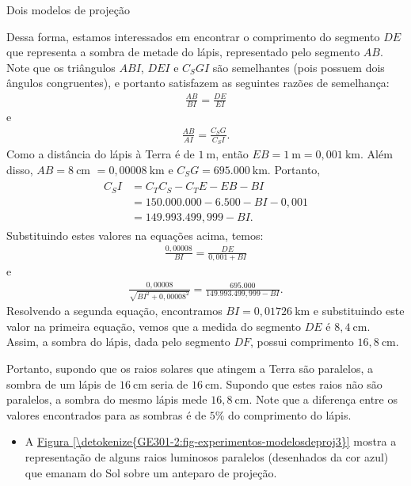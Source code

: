 \begin{answer}{Dois modelos de projeção}
{\begin{enumerate}
Dessa forma, estamos interessados em encontrar o comprimento do segmento \(DE\) que representa a sombra de metade do lápis, representado pelo segmento \(AB\). Note que os triângulos \(ABI\), \(DEI\) e \(C_SGI\) são semelhantes (pois possuem dois ângulos congruentes), e  portanto satisfazem as seguintes razões de semelhança:
\begin{equation*}
\begin{split}\frac{AB}{BI}=\frac{DE}{EI}\end{split}
\end{equation*}
e
\begin{equation*}
\begin{split}\frac{AB}{AI}=\frac{C_SG}{C_SI}.\end{split}
\end{equation*}
Como a distância do lápis à Terra é de \(1~\text{m}\), então \(EB=1~\text{m}=0{,}001~\text{km}\). Além disso, \(AB=8~\text{cm}\) \(=0{,}00008~\text{km}\) e \(C_SG= 695.000~\text{km}\). Portanto,
\begin{equation*}
\begin{split}\begin{array}{ll}
 C_SI & = C_TC_S-C_TE-EB-BI\\
         & = 150.000.000-6.500-BI-0,001 \\
         & = 149.993.499,999-BI.
\end{array}\end{split}
\end{equation*}
Substituindo estes valores na equações acima, temos:
\begin{equation*}
\begin{split}\frac{0,00008}{BI}=\frac{DE}{0,001+BI}\end{split}
\end{equation*}
e
\begin{equation*}
\begin{split}\frac{0,00008}{\sqrt{BI^2+0,00008^2}} = \frac{695.000}{149.993.499,999-BI}.\end{split}
\end{equation*}
Resolvendo a segunda equação, encontramos \(BI=0{,}01726~\text{km}\) e substituindo este valor na primeira equação, vemos que a medida do segmento \(DE\) é \(8{,}4~\text{cm}\). Assim, a sombra do lápis, dada pelo segmento \(DF\), possui comprimento \(16{,}8~\text{cm}\).

Portanto, supondo que os raios solares que atingem a Terra são paralelos, a sombra de um lápis de \(16~\text{cm}\) seria de \(16~\text{cm}\). Supondo que estes raios não são paralelos, a sombra do mesmo lápis mede \(16{,}8~\text{cm}\). Note que a diferença entre os valores encontrados para as sombras é de \(5\%\) do comprimento do lápis.
\begin{itemize}
\item {} 
A \hyperref[\detokenize{GE301-2:fig-experimentos-modelosdeproj3}]{Figura \ref{\detokenize{GE301-2:fig-experimentos-modelosdeproj3}}} mostra a representação de alguns raios luminosos paralelos (desenhados da cor azul) que emanam do Sol sobre um anteparo de projeção.


\end{itemize}
\end{enumerate}}
\end{answer}
